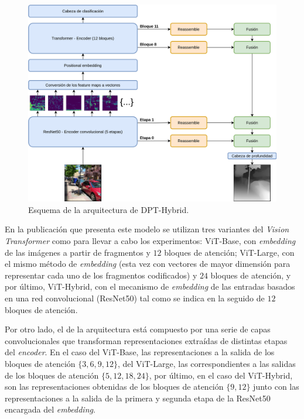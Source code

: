 \begin{figure}[H]
\centering
\includegraphics[width=\linewidth]{imagenes/DPT-general.png} 
\captionsetup{width=.7\linewidth}
\caption{Esquema de la arquitectura de DPT-Hybrid.}
\label{fig:dpt-hybrid}
\end{figure}

En la publicación que presenta este modelo se utilizan tres variantes del \textit{Vision Transformer} como  para llevar a cabo los experimentos: ViT-Base, con \textit{embedding} de las imágenes a partir de fragmentos y $12$ bloques de atención; ViT-Large, con el mismo método de \textit{embedding} (esta vez con vectores de mayor dimensión para representar cada uno de los fragmentos codificados) y $24$ bloques de atención, y por último, ViT-Hybrid, con el mecanismo de \textit{embedding} de las entradas basados en una red convolucional (ResNet50) tal como se indica en la  seguido de $12$ bloques de atención.

Por otro lado, el  de la arquitectura está compuesto por una serie de capas convolucionales que transforman representaciones extraídas de distintas etapas del \textit{encoder}. En el caso del ViT-Base, las representaciones a la salida de los bloques de atención $\{3, 6, 9, 12\}$, del ViT-Large, las correspondientes a las salidas de los bloques de atención $\{5, 12, 18, 24\}$, por último, en el caso del ViT-Hybrid, son las representaciones obtenidas de los bloques de atención $\{9, 12\}$ junto con las representaciones a la salida de la primera y segunda etapa de la ResNet50 encargada del \textit{embedding}.


